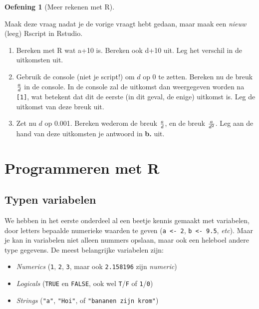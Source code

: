 \documentclass[
  a4paper,
]{scrbook}
\providecommand{\tightlist}{%
  \setlength{\itemsep}{0pt}\setlength{\parskip}{0pt}}\usepackage{longtable,booktabs,array}
\theoremstyle{definition}
\newtheorem{exercise}{Oefening}[chapter]
\theoremstyle{remark}
\begin{document}
\begin{exercise}[Meer rekenen met
R]\protect\hypertarget{exr-rekenenmetR2}{}\label{exr-rekenenmetR2}

Maak deze vraag nadat je de vorige vraagt hebt gedaan, maar maak een
\emph{nieuw} (leeg) Rscript in Rstudio.

\begin{enumerate}
\def\labelenumi{\alph{enumi}.}
\tightlist
\item
  Bereken met R wat a+10 is. Bereken ook d+10 uit. Leg het verschil in
  de uitkomsten uit.
\item
  Gebruik de console (niet je script!) om \(d\) op 0 te zetten. Bereken
  nu de breuk \(a \over d\) in de console. In de console zal de uitkomst
  dan weergegeven worden na \texttt{{[}1{]}}, wat betekent dat dit de
  eerste (in dit geval, de enige) uitkomst is. Leg de uitkomst van deze
  breuk uit.
\item
  Zet nu \(d\) op 0.001. Bereken wederom de breuk \(a \over d\), en de
  breuk \(a \over d^2\). Leg aan de hand van deze uitkomsten je antwoord
  in \textbf{b.} uit.
\end{enumerate}

\end{exercise}

\chapter{Programmeren met R}\label{sec-Rprogrammeren}

\section{Typen variabelen}\label{typen-variabelen}

We hebben in het eerste onderdeel al een beetje kennis gemaakt met
variabelen, door letters bepaalde numerieke waarden te geven
(\texttt{a\ \textless{}-\ 2}, \texttt{b\ \textless{}-\ 9.5},
\emph{etc}). Maar je kan in variabelen niet alleen nummers opslaan, maar
ook een heleboel andere type gegevens. De meest belangrijke variabelen
zijn:

\begin{itemize}
\item
  \emph{Numerics} (\texttt{1}, \texttt{2}, \texttt{3}, maar ook
  \texttt{2.158196} zijn \emph{numeric})
\item
  \emph{Logicals} (\texttt{TRUE} en \texttt{FALSE}, ook wel
  \texttt{T}/\texttt{F} of \texttt{1}/\texttt{0})
\item
  \emph{Strings} (\texttt{"a"}, \texttt{"Hoi"}, of
  \texttt{"bananen\ zijn\ krom"})
\end{itemize}
\end{document}
